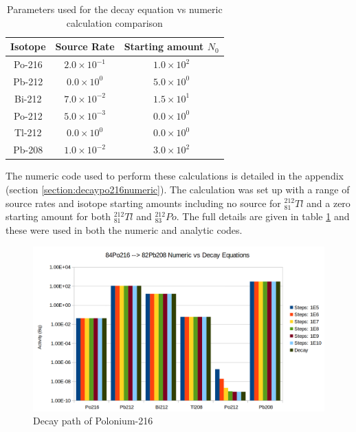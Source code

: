 \begin{table}[h]
\begin{center}
\begin{tabular}{c c c}
\hline\hline
Isotope & Source Rate & Starting amount $N_0$ \\
\hline\hline
Po-216 & $2.0 \times 10^{-1}$ & $1.0 \times 10^{2}$ \\
Pb-212 & $0.0 \times 10^{0}$  & $5.0 \times 10^{0}$ \\
Bi-212 & $7.0 \times 10^{-2}$ & $1.5 \times 10^{1}$ \\
Po-212 & $5.0 \times 10^{-3}$ & $0.0 \times 10^{0}$ \\
Tl-212 & $0.0 \times 10^{0}$  & $0.0 \times 10^{0}$ \\
Pb-208 & $1.0 \times 10^{-2}$ & $3.0 \times 10^{2}$  \\
\hline\hline
\end{tabular}
\end{center}
\caption{Parameters used for the decay equation vs numeric calculation comparison}
\label{table:po216parameters}
\end{table}

The numeric code used to perform these calculations is detailed in the appendix (section \ref{section:decaypo216numeric}).  The calculation was set up with a range of source rates and isotope starting amounts including no source for ${}^{212}_{81}Tl$ and a zero starting amount for both ${}^{212}_{81}Tl$ and ${}^{212}_{83}Po$.  The full details are given in table \ref{table:po216parameters} and these were used in both the numeric and analytic codes.

\FloatBarrier
\begin{figure}[h]
  \begin{center}
    \includegraphics[width=0.7\linewidth]{chapters/activity_code/84po216/decay_84Po216.png}
    \caption{Decay path of Polonium-216}
    \label{fig:decay_equations_vs_analytic}
  \end{center}
\end{figure}

